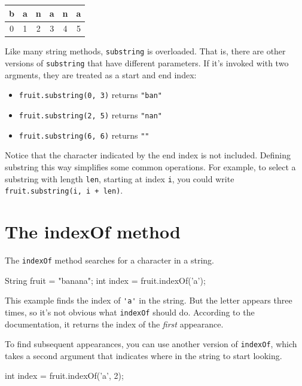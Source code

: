 \documentclass[12pt]{book}
\theoremstyle{exercise}
\newcommand{\java}[1]{\verb"#1"}
\begin{document}
\begin{center}
\begin{tabular}{c|c|c|c|c|c}
b & a & n & a & n & a \\
\hline
0 & 1 & 2 & 3 & 4 & 5 \\
\end{tabular}
\end{center}

Like many string methods, \java{substring} is overloaded.
That is, there are other versions of \java{substring} that have different parameters.
If it's invoked with two argments, they are treated as a start and end index:

\begin{itemize}
\item \java{fruit.substring(0, 3)} returns \verb|"ban"|
\item \java{fruit.substring(2, 5)} returns \verb|"nan"|
\item \java{fruit.substring(6, 6)} returns \verb|""|
\end{itemize}

Notice that the character indicated by the end index is not included.
Defining substring this way simplifies some common operations.
For example, to select a substring with length \java{len}, starting at index \java{i}, you could write \java{fruit.substring(i, i + len)}.


\section{The indexOf method}

The \java{indexOf} method searches for a character in a string.

\begin{code}
    String fruit = "banana";
    int index = fruit.indexOf('a');
\end{code}

This example finds the index of \java{'a'} in the string.
But the letter appears three times, so it's not obvious what \java{indexOf} should do.
According to the documentation, it returns the index of the {\em first} appearance.

To find subsequent appearances, you can use another version of \java{indexOf}, which takes a second argument that indicates where in the string to start looking.

\begin{code}
    int index = fruit.indexOf('a', 2);
\end{code}
\end{document}
